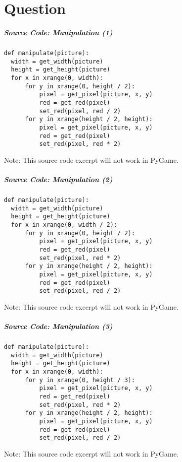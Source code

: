 \part{Question}
\frame{\partpage}


\begin{frame}[fragile]
	\frametitle{Source Code: Manipulation (1)}
	
\begin{lstlisting}
def manipulate(picture):
  width = get_width(picture)
  height = get_height(picture)
  for x in xrange(0, width):
      for y in xrange(0, height / 2):
          pixel = get_pixel(picture, x, y)
          red = get_red(pixel)
          set_red(pixel, red / 2)
      for y in xrange(height / 2, height):
          pixel = get_pixel(picture, x, y)
          red = get_red(pixel)
          set_red(pixel, red * 2)
\end{lstlisting}

Note: This source code excerpt will not work in PyGame.

\end{frame}

\begin{frame}[fragile]
	\frametitle{Source Code: Manipulation (2)}
	
\begin{lstlisting}
def manipulate(picture):
  width = get_width(picture)
  height = get_height(picture)
  for x in xrange(0, width / 2):
      for y in xrange(0, height / 2):
          pixel = get_pixel(picture, x, y)
          red = get_red(pixel)
          set_red(pixel, red * 2)
      for y in xrange(height / 2, height):
          pixel = get_pixel(picture, x, y)
          red = get_red(pixel)
          set_red(pixel, red / 2)
\end{lstlisting}

Note: This source code excerpt will not work in PyGame.

\end{frame}

\begin{frame}[fragile]
	\frametitle{Source Code: Manipulation (3)}
	
\begin{lstlisting}
def manipulate(picture):
  width = get_width(picture)
  height = get_height(picture)
  for x in xrange(0, width):
      for y in xrange(0, height / 3):
          pixel = get_pixel(picture, x, y)
          red = get_red(pixel)
          set_red(pixel, red * 2)
      for y in xrange(height / 2, height):
          pixel = get_pixel(picture, x, y)
          red = get_red(pixel)
          set_red(pixel, red / 2)
\end{lstlisting}

Note: This source code excerpt will not work in PyGame.

\end{frame}

